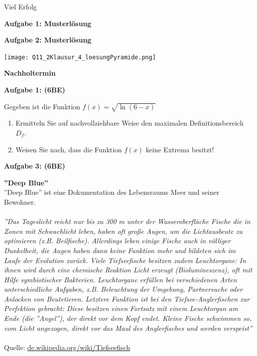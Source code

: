 \documentclass[a4paper,12pt]{article}
\newcommand{\Aufgabe}[1]{
  {
  \vspace*{0.5cm}
  \textsf{\textbf{Aufgabe #1}}
  \vspace*{0.2cm}
  
  }
}
\begin{document}
\vspace{0.5cm}


\centerline{Viel Erfolg}





\newpage
\Aufgabe{1: Musterlösung}

\Aufgabe{2: Musterlösung}
\texttt{[image: Q11\_2Klausur\_4\_loesungPyramide.png]}

\newpage

\textbf{Nachholtermin}

\Aufgabe{1: (6BE)}

Gegeben ist die Funktion $f\left(x\right)=\sqrt{\ln (6-x)}$

\begin{enumerate}[label={\alph*)}]
\item Ermitteln Sie auf nachvollziehbare Weise den maximalen Definitionsbereich $D_f$.
\item Weisen Sie nach, dass die Funktion $f(x)$ keine Extrema besitzt!
\end{enumerate}


\Aufgabe{3: (6BE)} \textbf{''Deep Blue''}\\

''Deep Blue'' ist eine Dokumentation des Lebensraums Meer und seiner Bewohner. \\
   \\ 
\textit{''Das Tageslicht reicht nur bis zu 300 m unter der Wasseroberfläche Fische die in Zonen mit Schwachlicht leben, haben oft große Augen, um die Lichtausbeute zu optimieren (z.B. Beilfische). Allerdings leben einige Fische auch in völliger Dunkelheit, die Augen haben dann keine Funktion mehr und bildeten sich im Laufe der Evolution zurück. Viele Tiefseefische besitzen zudem Leuchtorgane: In ihnen wird durch eine chemische Reaktion Licht erzeugt (Biolumineszenz), oft mit Hilfe symbiotischer Bakterien. Leuchtorgane erfüllen bei verschiedenen Arten unterschiedliche Aufgaben, z.B. Beleuchtung der Umgebung, Partnersuche oder Anlocken von Beutetieren. Letztere Funktion ist bei den Tiefsee-Anglerfischen zur Perfektion gebracht: Diese besitzen einen Fortsatz mit einem Leuchtorgan am Ende (die ''Angel''), der direkt vor dem Kopf endet. Kleine Fische schwimmen so, vom Licht angezogen, direkt vor das Maul des Anglerfisches und werden verspeist''}\\
\\
Quelle: \href{https://de.wikipedia.org/wiki/Tiefseefisch}{de.wikipedia.org/wiki/Tiefseefisch}\\
\\
\end{document}
